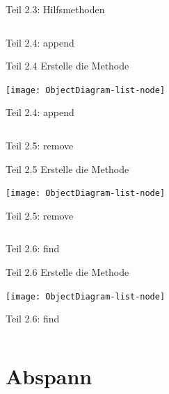 \documentclass[usepdftitle=false,hyperref={pdfpagelabels=false}]{beamer}
\begin{document}
\begin{frame}{Teil 2.3: Hilfsmethoden}
    \inputminted[linenos=true, numbersep=5pt, tabsize=4, fontsize=\tiny, firstnumber=5, firstline=5, lastline=21]{java}{SinglyLinkedList.java}
\end{frame}

\begin{frame}{Teil 2.4: append}
    \begin{block}{Teil 2.4}
        Erstelle die Methode 
    \end{block}
    \texttt{[image: ObjectDiagram-list-node]}
\end{frame}

\begin{frame}{Teil 2.4: append}
    \inputminted[linenos=true, numbersep=5pt, tabsize=4, fontsize=\tiny, firstnumber=23, firstline=23, lastline=34]{java}{SinglyLinkedList.java}
\end{frame}

\begin{frame}{Teil 2.5: remove}
    \begin{block}{Teil 2.5}
        Erstelle die Methode 
    \end{block}
    \texttt{[image: ObjectDiagram-list-node]}
\end{frame}

\begin{frame}{Teil 2.5: remove}
    \inputminted[linenos=true, numbersep=5pt, tabsize=4, fontsize=\tiny, firstnumber=36, firstline=36, lastline=48]{java}{SinglyLinkedList.java}
\end{frame}

\begin{frame}{Teil 2.6: find}
    \begin{block}{Teil 2.6}
        Erstelle die Methode 
    \end{block}
    \texttt{[image: ObjectDiagram-list-node]}
\end{frame}

\begin{frame}{Teil 2.6: find}
    \inputminted[linenos=true, numbersep=5pt, tabsize=4, fontsize=\tiny, firstnumber=50, firstline=50, lastline=58]{java}{SinglyLinkedList.java}
\end{frame}

\section{Abspann}
\end{document}
